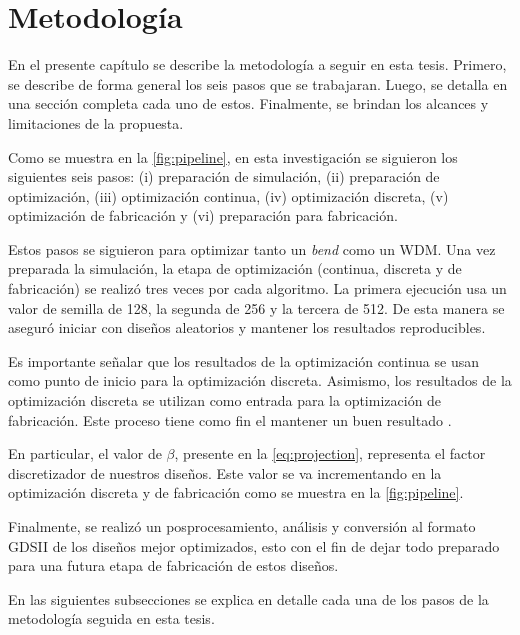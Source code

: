\chapter{Metodología}\label{chapter:methodology}

En el presente capítulo se describe la metodología a seguir en esta tesis.
Primero, se describe de forma general los seis pasos que se trabajaran.
Luego, se detalla en una sección completa cada uno de estos.
Finalmente, se brindan los alcances y limitaciones de la propuesta.

Como se muestra en la \autoref{fig:pipeline}, en esta investigación se siguieron los siguientes seis pasos:
(i) preparación de simulación, 
(ii) preparación de optimización, 
(iii) optimización continua,
(iv) optimización discreta,
(v) optimización de fabricación y
(vi) preparación para fabricación.

Estos pasos se siguieron para optimizar tanto un \emph{bend} como un WDM.
Una vez preparada la simulación, la etapa de optimización (continua, discreta y de fabricación) se realizó
tres veces por cada algoritmo.
La primera ejecución usa un valor de semilla de 128, la segunda de 256 y la tercera de 512.
De esta manera se aseguró iniciar con diseños aleatorios y mantener los resultados reproducibles.

Es importante señalar que los resultados de la optimización continua se usan como punto de inicio
para la optimización discreta. Asimismo, los resultados de la optimización discreta se utilizan como
entrada para la optimización de fabricación.
Este proceso tiene como fin el mantener un buen resultado \citep{Yang2017}.


En particular, el valor de $\beta$, presente en la \autoref{eq:projection}, representa el factor discretizador de nuestros diseños.
Este valor se va incrementando en la optimización discreta y de fabricación como se muestra en la
\autoref{fig:pipeline}.

Finalmente, se realizó un posprocesamiento, análisis y conversión al
formato GDSII de los diseños mejor optimizados, esto con el fin de dejar todo preparado
para una futura etapa de fabricación de estos diseños.

En las siguientes subsecciones se explica en detalle cada una de los pasos de la metodología seguida en esta tesis.

